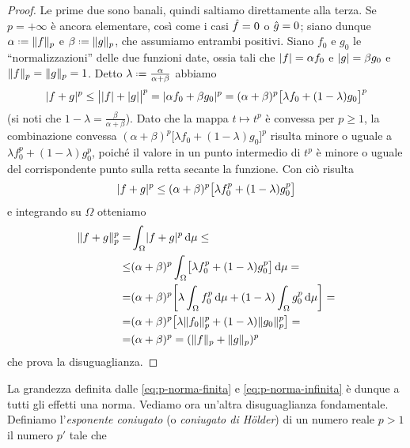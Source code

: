 \begin{proof}
    Le prime due sono banali, quindi saltiamo direttamente alla terza.
    Se $p=+\infty$ è ancora elementare, cos\`i come i casi $\eqc{f}=0$ o $\eqc{g}=0$; siano dunque $\alpha\defeq\norm{f}_p$ e $\beta\defeq\norm{g}_p$, che assumiamo entrambi positivi.
    Siano $f_0$ e $g_0$ le ``normalizzazioni'' delle due funzioni date, ossia tali che $\abs{f}=\alpha f_0$ e $\abs{g}=\beta g_0$ e $\norm{f}_p=\norm{g}_p=1$.
    Detto $\lambda\defeq\frac{\alpha}{\alpha+\beta}$ abbiamo
    \begin{equation}
        \abs{f+g}^p\le
        \abs[\big]{\abs{f}+\abs{g}}^p=
        \abs{\alpha f_0+\beta g_0}^p=
        (\alpha+\beta)^p\bigl[\lambda f_0+(1-\lambda)g_0\bigr]^p
    \end{equation}
    (si noti che $1-\lambda=\frac{\beta}{\alpha+\beta}$).
    Dato che la mappa $t\mapsto t^p$ è convessa per $p\ge 1$, la combinazione convessa $(\alpha+\beta)^p\bigl[\lambda f_0+(1-\lambda)g_0\bigr]^p$ risulta minore o uguale a $\lambda f_0^p+(1-\lambda)g_0^p$, poich\'e il valore in un punto intermedio di $t^p$ è minore o uguale del corrispondente punto sulla retta secante la funzione.
    Con ciò risulta
    \begin{equation}
        \abs{f+g}^p\le
        (\alpha+\beta)^p\bigl[\lambda f_0^p+(1-\lambda)g_0^p\bigr]
    \end{equation}
    e integrando su $\Omega$ otteniamo
    \begin{equation}
        \begin{split}
            \norm{f+g}_p^p=&
            \int_\Omega \abs{f+g}^p\,\dd\mu\le\\\le&
            (\alpha+\beta)^p\int_\Omega\bigl[\lambda f_0^p+(1-\lambda)g_0^p\bigr]\,\dd\mu=\\=&
            (\alpha+\beta)^p\biggl[\lambda\int_\Omega f_0^p\,\dd\mu+(1-\lambda)\int_\Omega g_0^p\,\dd\mu\biggr]=\\=&
            (\alpha+\beta)^p\bigl[\lambda\norm{f_0}_p^p+(1-\lambda)\norm{g_0}_p^p\bigr]=\\=&
            (\alpha+\beta)^p=(\norm{f}_p+\norm{g}_p)^p
        \end{split}
    \end{equation}
    che prova la disuguaglianza.
\end{proof}
La grandezza definita dalle \eqref{eq:p-norma-finita} e \eqref{eq:p-norma-infinita} è dunque a tutti gli effetti una norma.
Vediamo ora un'altra disuguaglianza fondamentale.
Definiamo l'\emph{esponente coniugato} (o \emph{coniugato di H\"older}) di un numero reale $p>1$ il numero $p'$ tale che
